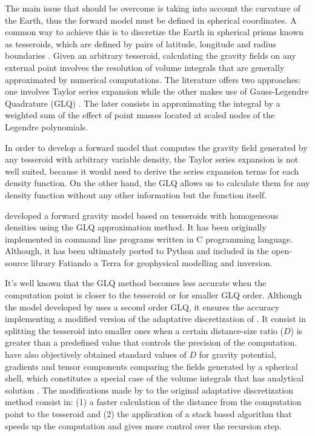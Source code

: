 \documentclass[extra]{gji}
\begin{document}
The main issue that should be overcome is taking into account the curvature of the Earth, thus the forward model must be defined in spherical coordinates.
A common way to achieve this is to discretize the Earth in spherical prisms known as tesseroids, which are defined by pairs of latitude, longitude and radius boundaries .
Given an arbitrary tesseroid, calculating the gravity fields on any external point involves the resolution of volume integrals that are generally approximated by numerical computations.
The literature offers two approaches: one involves Taylor series expansion \citep{Heck2007, Grombein2013} while the other makes use of Gauss-Legendre Quadrature (GLQ) \citep{Asgharzadeh2007, Uieda2016, Uieda2017}. The later consists in approximating the integral by a weighted sum of the effect of point masses located at scaled nodes of the Legendre polynomials.

In order to develop a forward model that computes the gravity field generated by any tesseroid with arbitrary variable density, the Taylor series expansion is not well suited, because it would need to derive the series expansion terms for each density function. On the other hand, the GLQ allows us to calculate them for any density function without any other information but the function itself.

\citet{Uieda2016} developed a forward gravity model based on tesseroids with homogeneous densities using the GLQ approximation method.
It has been originally implemented in command line programs written in C programming language. Although, it has been ultimately ported to Python and included in the open-source library Fatiando a Terra \citep{Uieda2013} for geophysical modelling and inversion.

It's well known that the GLQ method becomes less accurate when the computation point is closer to the tesseroid \citep{Ku1977} or for smaller GLQ order. 
Although the model developed by \citet{Uieda2016} uses a second order GLQ, it ensures the accuracy implementing a modified version of the adaptative discretization of \citet{Li2011}.
It consist in splitting the tesseroid into smaller ones when a certain distance-size ratio ($D$) is greater than a predefined value that controls the precision of the computation.  \citet{Uieda2016} have also objectively obtained standard values of $D$ for gravity potential, gradients and tensor components comparing the fields generated by a spherical shell, which constitutes a special case of the volume integrals that has analytical solution \citep{LaFehr1991, Mikuska2006, Grombein2013}.
The modifications made by \citet{Uieda2016} to the original adaptative discretization method \citep{Li2011} consist in:
(1) a faster calculation of the distance from the computation point to the tesseroid and 
(2) the application of a stack based algorithm that speeds up the computation and gives more control over the recursion step.
\end{document}
